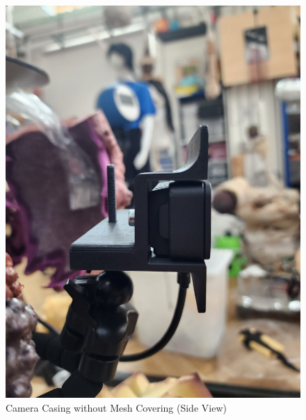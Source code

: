 \begin{figure}[H]
    \centering
    \begin{minipage}{0.45\textwidth}
        \centering
        \includegraphics[width=\textwidth, angle=-90]{Images/CameraCasingNoMesh (4).jpg}
        \caption{Camera Casing without Mesh Covering (Side View)}
        \label{fig:camera_casing_no_mesh_side}
    \end{minipage}
    \hfill
    \begin{minipage}{0.45\textwidth}
        \centering

\end{minipage}
\end{figure}
